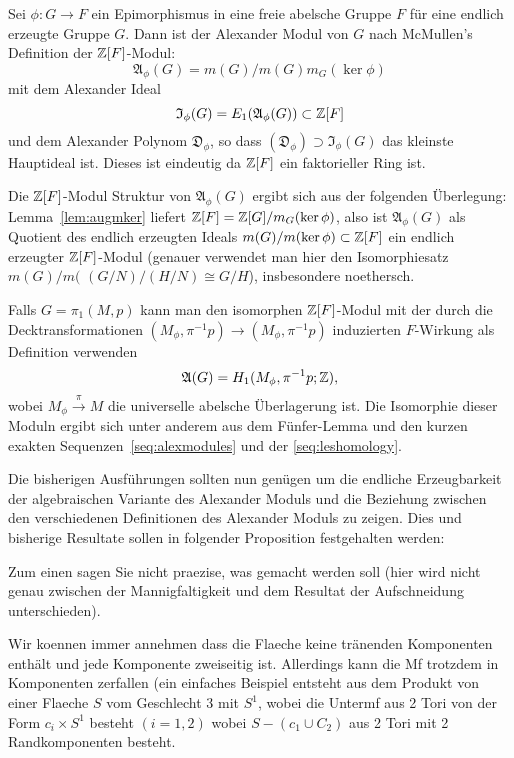\begin{defn}
\label{def:Mcmullen}
	Sei $\phi: G \to F$ ein Epimorphismus in eine freie abelsche Gruppe $F$ für eine endlich erzeugte Gruppe $G$. Dann ist der Alexander Modul von $G$ nach McMullen's Definition der $\mathbb{Z}[F]$-Modul:
	\[
		\mathfrak A_\phi(G) = m(G)/m(G)m_G(\ker\phi)
	\]
	mit dem Alexander Ideal
	\[
		\mathfrak I_\phi(G) = E_1 (\mathfrak A_\phi(G)) \subset \mathbb{Z}[F]
	\]
	und dem Alexander Polynom $\mathfrak D_\phi$, so dass $(\mathfrak D_\phi ) \supset \mathfrak I_\phi(G)$ das kleinste Hauptideal ist. Dieses ist eindeutig da $\mathbb{Z}[F]$ ein faktorieller Ring ist.

\begin{bem}
\label{bem:alexmcmendlerz}
Die $\mathbb{Z}[F]$-Modul Struktur von $\mathfrak A_\phi(G)$ ergibt sich aus der folgenden Überlegung: Lemma~\ref{lem:augmker} liefert $\mathbb{Z}[F]=\mathbb{Z}[G]/m_G(\ker\phi)$, also ist $\mathfrak A_\phi(G)$ als Quotient des endlich erzeugten Ideals $m(G)/m(\ker\phi) \subset \mathbb{Z}[ F]$ ein endlich erzeugter $\mathbb{Z} [F]$-Modul (genauer verwendet man hier den Isomorphiesatz $m(G)/m($ $(G/N)/(H/N)\cong G/H$), insbesondere noethersch.
\end{bem}

	Falls $G=\pi_1(M,p)$ kann man den isomorphen $\mathbb{Z}[F]$-Modul mit der durch die Decktransformationen $(M_\phi,\pi^{-1}p) \to (M_\phi,\pi^{-1}p)$ induzierten $F$-Wirkung als Definition verwenden
	\[
		\mathfrak A(G)= H_1(M_\phi,\pi^{-1}p;\mathbb{Z}),
	\]
	wobei $M_\phi \stackrel \pi \to M$ die universelle abelsche Überlagerung ist. Die Isomorphie dieser Moduln ergibt sich unter anderem aus dem Fünfer-Lemma und den kurzen exakten Sequenzen~\eqref{seq:alexmodules} und der \eqref{seq:leshomology}.
\end{defn}


Die bisherigen Ausführungen sollten nun genügen um die endliche Erzeugbarkeit der algebraischen Variante des Alexander Moduls und die Beziehung zwischen den verschiedenen Definitionen des Alexander Moduls zu zeigen. Dies und bisherige Resultate sollen in folgender Proposition festgehalten werden:

Zum einen sagen Sie nicht praezise, was gemacht werden soll (hier wird nicht genau zwischen der Mannigfaltigkeit und dem Resultat der Aufschneidung unterschieden).

Wir koennen immer annehmen dass die Flaeche keine tränenden Komponenten enthält und jede Komponente zweiseitig ist.
Allerdings kann die Mf trotzdem in Komponenten zerfallen (ein einfaches Beispiel entsteht aus dem Produkt von einer Flaeche $S$ vom Geschlecht 3 mit $S^1$, wobei die Untermf aus 2 Tori von der Form $c_i\times S^1$ besteht $(i=1,2)$ wobei $S-(c_1\cup C_2)$ aus 2 Tori mit 2 Randkomponenten besteht.

